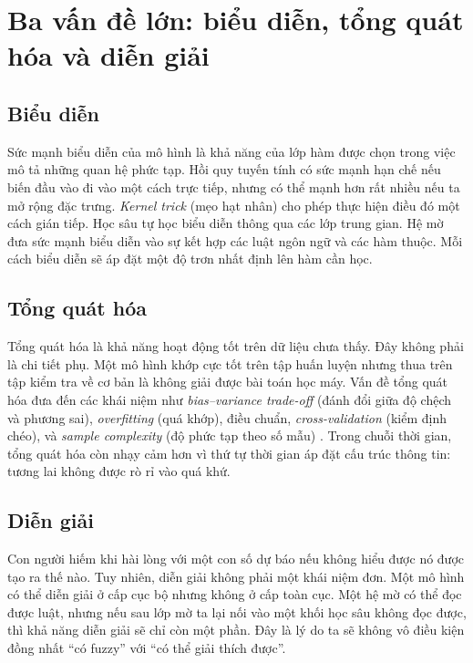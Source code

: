 \section{Ba vấn đề lớn: biểu diễn, tổng quát hóa và diễn giải}

\subsection{Biểu diễn}

Sức mạnh biểu diễn của mô hình là khả năng của lớp hàm được chọn trong việc mô tả những quan hệ phức tạp. Hồi quy tuyến tính có sức mạnh hạn chế nếu biến đầu vào đi vào một cách trực tiếp, nhưng có thể mạnh hơn rất nhiều nếu ta mở rộng đặc trưng. \emph{Kernel trick} (mẹo hạt nhân) cho phép thực hiện điều đó một cách gián tiếp. Học sâu tự học biểu diễn thông qua các lớp trung gian. Hệ mờ đưa sức mạnh biểu diễn vào sự kết hợp các luật ngôn ngữ và các hàm thuộc. Mỗi cách biểu diễn sẽ áp đặt một độ trơn nhất định lên hàm cần học.

\subsection{Tổng quát hóa}

Tổng quát hóa là khả năng hoạt động tốt trên dữ liệu chưa thấy. Đây không phải là chi tiết phụ. Một mô hình khớp cực tốt trên tập huấn luyện nhưng thua trên tập kiểm tra về cơ bản là không giải được bài toán học máy. Vấn đề tổng quát hóa đưa đến các khái niệm như \emph{bias--variance trade-off} (đánh đổi giữa độ chệch và phương sai), \emph{overfitting} (quá khớp), điều chuẩn, \emph{cross-validation} (kiểm định chéo), và \emph{sample complexity} (độ phức tạp theo số mẫu) \citep{hastie2009esl,bishop2006prml}. Trong chuỗi thời gian, tổng quát hóa còn nhạy cảm hơn vì thứ tự thời gian áp đặt cấu trúc thông tin: tương lai không được rò rỉ vào quá khứ.

\subsection{Diễn giải}

Con người hiếm khi hài lòng với một con số dự báo nếu không hiểu được nó được tạo ra thế nào. Tuy nhiên, diễn giải không phải một khái niệm đơn. Một mô hình có thể diễn giải ở cấp cục bộ nhưng không ở cấp toàn cục. Một hệ mờ có thể đọc được luật, nhưng nếu sau lớp mờ ta lại nối vào một khối học sâu không đọc được, thì khả năng diễn giải sẽ chỉ còn một phần. Đây là lý do ta sẽ không vô điều kiện đồng nhất ``có fuzzy'' với ``có thể giải thích được''.

